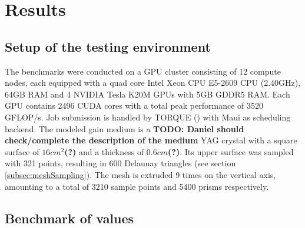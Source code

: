 \section{Results}

\subsection{Setup of the testing environment}
\label{subsec:testingEnvironment}

The benchmarks were conducted on a GPU cluster consisting of 12 compute nodes,
each equipped with a quad core Intel Xeon CPU E5-2609 CPU (2.40GHz), 64GB RAM
and 4 NVIDIA Tesla K20M GPUs with 5GB GDDR5 RAM. Each GPU contains 2496 CUDA cores with a total
peak performance of 3520 GFLOP/s. Job submission is handled by TORQUE
(\cite{torque}) with Maui as scheduling backend. The modeled gain medium is a
\textbf{TODO: Daniel should check/complete the description of the medium} YAG
crystal with a square surface of $16cm^2$\textbf{(?)} and a thickness of
$0.6cm$\textbf{(?)}. Its upper surface was sampled with 321 points, resulting in
600 Delaunay triangles (see section \ref{subsec:meshSampling}). The mesh is
extruded 9 times on the vertical axis, amounting to a total of 3210 sample
points and 5400 prisms respectively.

\subsection{Benchmark of values}

